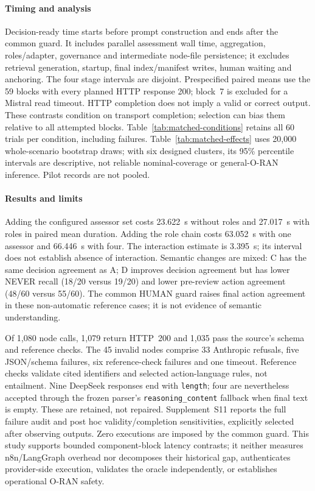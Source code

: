 \begin{revision}
\paragraph{Timing and analysis}
Decision-ready time starts before prompt construction and ends after the
common guard. It includes parallel assessment wall time, aggregation,
roles/adapter, governance and intermediate node-file persistence; it excludes
retrieval generation, startup, final index/manifest writes, human waiting
and anchoring. The four stage intervals are disjoint. Prespecified paired
means use the 59 blocks with every planned HTTP response 200; block~7 is
excluded for a Mistral read timeout. HTTP completion does not imply a valid
or correct output. These contrasts condition on transport completion;
selection can bias them relative to all attempted blocks. Table~\ref{tab:matched-conditions} retains all 60 trials
per condition, including failures. Table~\ref{tab:matched-effects} uses
20,000 whole-scenario bootstrap draws; with six designed clusters, its 95\%
percentile intervals are descriptive, not reliable nominal-coverage or
general-O-RAN inference. Pilot records are not pooled.



\paragraph{Results and limits}
Adding the configured assessor set costs 23.622~s without roles and
27.017~s with roles in paired mean duration. Adding the role chain costs
63.052~s with one assessor and 66.446~s with four. The interaction estimate
is 3.395~s; its interval does not establish absence of interaction.
Semantic changes are mixed: C has the same decision agreement as A;
D improves decision agreement but has lower NEVER recall (18/20 versus
19/20) and lower pre-review action agreement (48/60 versus 55/60).
The common HUMAN guard raises final action agreement in these non-automatic
reference cases; it is not evidence of semantic understanding.

Of 1,080 node calls, 1,079 return HTTP~200 and 1,035 pass the source's schema
and reference checks. The 45 invalid nodes comprise 33 Anthropic refusals,
five JSON/schema failures, six reference-check failures and one timeout.
Reference checks validate cited identifiers and selected action-language
rules, not entailment. Nine DeepSeek responses end with \texttt{length};
four are nevertheless accepted through the frozen parser's
\texttt{reasoning\_content} fallback when final text is empty. These are
retained, not repaired. Supplement~S11 reports the full failure audit and
post hoc validity/completion sensitivities, explicitly selected after
observing outputs. Zero executions are imposed by the common guard.
This study supports bounded component-block latency contrasts; it neither
measures n8n/LangGraph overhead nor decomposes their historical gap,
authenticates provider-side execution, validates the oracle independently,
or establishes operational O-RAN safety.
\end{revision}
